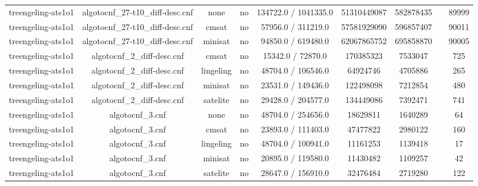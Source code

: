 \begin{appendices}
\begin{table}[p]
\begin{center}
\begin{tabular}{l|cccccccc}
  treengeling-ats1o1             & algotocnf\_27-t10\_diff-desc.cnf & none       & no    & 134722.0 / 1041335.0 & 51310449087 & 582878435 &            & 89999 \\ %
  treengeling-ats1o1             & algotocnf\_27-t10\_diff-desc.cnf & cmsat      & no    & 57956.0 / 311219.0 & 57581929090 & 596857407 &            & 90011 \\ %
  treengeling-ats1o1             & algotocnf\_27-t10\_diff-desc.cnf & minisat    & no    & 94850.0 / 619480.0 & 62067865752 & 695858870 &            & 90005 \\ %
  treengeling-ats1o1             & algotocnf\_2\_diff-desc.cnf    & cmsat      & no    & 15342.0 / 72870.0 & 170385323 & 7533047   &            & 725 \\ %
  treengeling-ats1o1             & algotocnf\_2\_diff-desc.cnf    & lingeling  & no    & 48704.0 / 106546.0 & 64924746  & 4705886   &            & 265 \\ %
  treengeling-ats1o1             & algotocnf\_2\_diff-desc.cnf    & minisat    & no    & 23531.0 / 149436.0 & 122498098 & 7212854   &            & 480 \\ %
  treengeling-ats1o1             & algotocnf\_2\_diff-desc.cnf    & satelite   & no    & 29428.0 / 204577.0 & 134449086 & 7392471   &            & 741 \\ %
  treengeling-ats1o1             & algotocnf\_3.cnf               & none       & no    & 48704.0 / 254656.0 & 18629811  & 1640289   &            & 64 \\ %
  treengeling-ats1o1             & algotocnf\_3.cnf               & cmsat      & no    & 23893.0 / 111403.0 & 47477822  & 2980122   &            & 160 \\ %
  treengeling-ats1o1             & algotocnf\_3.cnf               & lingeling  & no    & 48704.0 / 100941.0 & 11161253  & 1139418   &            & 17 \\ %
  treengeling-ats1o1             & algotocnf\_3.cnf               & minisat    & no    & 20895.0 / 119580.0 & 11430482  & 1109257   &            & 42 \\ %
  treengeling-ats1o1             & algotocnf\_3.cnf               & satelite   & no    & 28647.0 / 156910.0 & 32476484  & 2719280   &            & 122 \\ %


\end{tabular}
\end{center}
\end{table}
\end{appendices}
